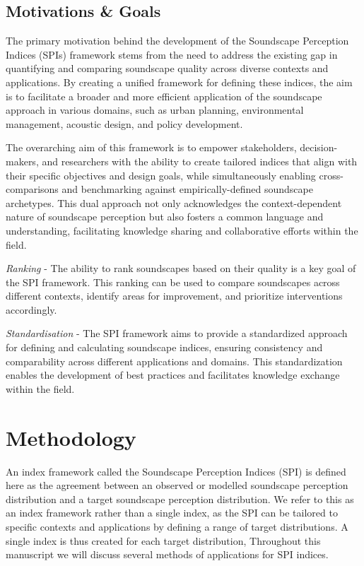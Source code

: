\documentclass[
  authoryear,
  preprint,
  3p]{elsarticle}
\begin{document}
\subsection{Motivations \& Goals}\label{motivations-goals}

The primary motivation behind the development of the Soundscape
Perception Indices (SPIs) framework stems from the need to address the
existing gap in quantifying and comparing soundscape quality across
diverse contexts and applications. By creating a unified framework for
defining these indices, the aim is to facilitate a broader and more
efficient application of the soundscape approach in various domains,
such as urban planning, environmental management, acoustic design, and
policy development.

The overarching aim of this framework is to empower stakeholders,
decision-makers, and researchers with the ability to create tailored
indices that align with their specific objectives and design goals,
while simultaneously enabling cross-comparisons and benchmarking against
empirically-defined soundscape archetypes. This dual approach not only
acknowledges the context-dependent nature of soundscape perception but
also fosters a common language and understanding, facilitating knowledge
sharing and collaborative efforts within the field.

\emph{Ranking} - The ability to rank soundscapes based on their quality
is a key goal of the SPI framework. This ranking can be used to compare
soundscapes across different contexts, identify areas for improvement,
and prioritize interventions accordingly.

\emph{Standardisation} - The SPI framework aims to provide a
standardized approach for defining and calculating soundscape indices,
ensuring consistency and comparability across different applications and
domains. This standardization enables the development of best practices
and facilitates knowledge exchange within the field.

\section{Methodology}\label{methodology}

An index framework called the Soundscape Perception Indices (SPI) is
defined here as the agreement between an observed or modelled soundscape
perception distribution and a target soundscape perception distribution.
We refer to this as an index framework rather than a single index, as
the SPI can be tailored to specific contexts and applications by
defining a range of target distributions. A single index is thus created
for each target distribution, Throughout this manuscript we will discuss
several methods of applications for SPI indices.
\end{document}
